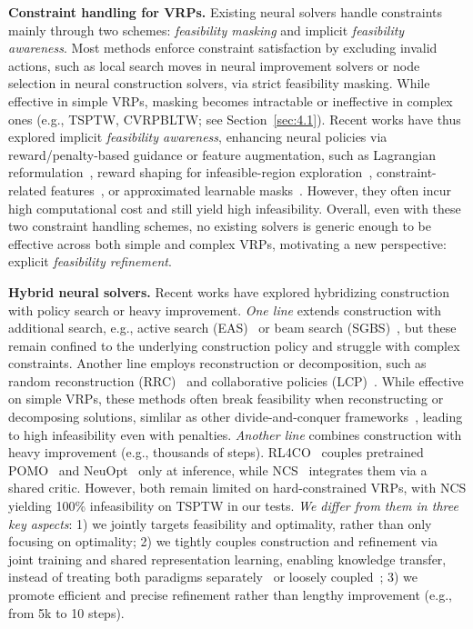 \documentclass{article} %
\begin{document}



\textbf{Constraint handling for VRPs.} 
Existing neural solvers handle constraints mainly through two schemes: \emph{feasibility masking} and implicit \emph{feasibility awareness}. Most methods enforce constraint satisfaction by excluding invalid actions, such as local search moves in neural improvement solvers or node selection in neural construction solvers, via strict feasibility masking. While effective in simple VRPs, masking becomes intractable or ineffective in complex ones (e.g., TSPTW, CVRPBLTW; see Section~\ref{sec:4.1}). Recent works have thus explored implicit \emph{feasibility awareness}, enhancing neural policies via reward/penalty-based guidance or feature augmentation, such as Lagrangian reformulation~\citep{tang2022learning}, reward shaping for infeasible-region exploration~\citep{ma2023learning}, constraint-related features~\citep{chen2024looking}, or approximated learnable masks~\citep{bi2024learning}. However, they often incur high computational cost and still yield high infeasibility. Overall, even with these two constraint handling schemes, no existing solvers is generic enough to be effective across both simple and complex VRPs, motivating a new perspective: explicit \emph{feasibility refinement}.

\textbf{Hybrid neural solvers.} 
Recent works have explored hybridizing construction with policy search or heavy improvement. \textit{One line} extends construction with additional search, e.g., active search (EAS)~\citep{hottung2022efficient} or beam search (SGBS)~\citep{choo2022simulation}, but these remain confined to the underlying construction policy and struggle with complex constraints. Another line employs reconstruction or decomposition, such as random reconstruction (RRC)~\citep{luo2023neural} and collaborative policies (LCP)~\citep{Kim2021LearningCP}. While effective on simple VRPs, these methods often break feasibility when reconstructing or decomposing solutions, simlilar as other divide-and-conquer frameworks~\citep{ye2024glop,zheng2024udc}, leading to high infeasibility even with penalties. \textit{Another line} combines construction with heavy improvement (e.g., thousands of steps). {RL4CO~\citep{berto2025rl4co}} couples pretrained POMO~\citep{kwon2020pomo} and NeuOpt~\citep{ma2023learning} only at inference, while {NCS~\citep{kong2024efficient}} integrates them via a shared critic. However, both remain limited on hard-constrained VRPs, with NCS yielding 100\% infeasibility on TSPTW in our tests.
\emph{We differ from them in three key aspects}: 1) we jointly targets feasibility and optimality, rather than only focusing on optimality; 2) we tightly couples construction and refinement via joint training and shared representation learning, enabling knowledge transfer, instead of treating both paradigms separately{~\citep{berto2025rl4co}} or loosely coupled{~\citep{kong2024efficient}}; 3) we promote efficient and precise refinement rather than lengthy improvement (e.g., from 5k to 10 steps).
\end{document}
